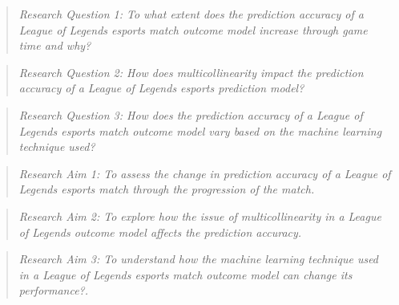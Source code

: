 \begin{quote}  \emph{Research Question 1: To what extent does the prediction accuracy of a League of Legends esports match outcome model increase through game time and why?} \end{quote}

\begin{quote}  \emph{Research Question 2: How does multicollinearity impact the prediction accuracy of a League of Legends esports prediction model?} \end{quote}

\begin{quote}  \emph{Research Question 3: How does the prediction accuracy of a League of Legends esports match outcome model vary based on the machine learning technique used?} \end{quote}

\begin{quote}  \emph{Research Aim 1: To assess the change in prediction accuracy of a League of Legends esports match through the progression of the match.} \end{quote}

\begin{quote}  \emph{Research Aim 2: To explore how the issue of multicollinearity in a League of Legends outcome model affects the prediction accuracy.} \end{quote}

\begin{quote}  \emph{Research Aim 3: To understand how the machine learning technique used in a League of Legends esports match outcome model can change its performance?.} \end{quote}